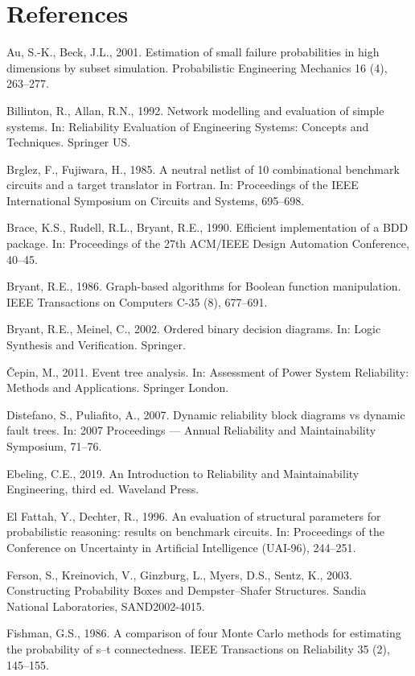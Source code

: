 \documentclass[preprint,12pt]{elsarticle}
\theoremstyle{definition}
\begin{document}
\section*{References}
\begingroup
\setlength{\parindent}{-1.5em}\setlength{\leftskip}{1.5em}\small

Au, S.-K., Beck, J.L., 2001. Estimation of small failure probabilities in high dimensions by subset
simulation. Probabilistic Engineering Mechanics 16 (4), 263--277.

Billinton, R., Allan, R.N., 1992. Network modelling and evaluation of simple systems. In: Reliability
Evaluation of Engineering Systems: Concepts and Techniques. Springer US.

Brglez, F., Fujiwara, H., 1985. A neutral netlist of 10 combinational benchmark circuits and a target
translator in Fortran. In: Proceedings of the IEEE International Symposium on Circuits and Systems,
695--698.

Brace, K.S., Rudell, R.L., Bryant, R.E., 1990. Efficient implementation of a BDD package. In:
Proceedings of the 27th ACM/IEEE Design Automation Conference, 40--45.

Bryant, R.E., 1986. Graph-based algorithms for Boolean function manipulation. IEEE Transactions on
Computers C-35 (8), 677--691.

Bryant, R.E., Meinel, C., 2002. Ordered binary decision diagrams. In: Logic Synthesis and Verification.
Springer.

\v{C}epin, M., 2011. Event tree analysis. In: Assessment of Power System Reliability: Methods and
Applications. Springer London.

Distefano, S., Puliafito, A., 2007. Dynamic reliability block diagrams vs dynamic fault trees. In: 2007
Proceedings --- Annual Reliability and Maintainability Symposium, 71--76.

Ebeling, C.E., 2019. An Introduction to Reliability and Maintainability Engineering, third ed. Waveland
Press.

El Fattah, Y., Dechter, R., 1996. An evaluation of structural parameters for probabilistic reasoning:
results on benchmark circuits. In: Proceedings of the Conference on Uncertainty in Artificial
Intelligence (UAI-96), 244--251.

Ferson, S., Kreinovich, V., Ginzburg, L., Myers, D.S., Sentz, K., 2003. Constructing Probability Boxes
and Dempster--Shafer Structures. Sandia National Laboratories, SAND2002-4015.

Fishman, G.S., 1986. A comparison of four Monte Carlo methods for estimating the probability of s--t
connectedness. IEEE Transactions on Reliability 35 (2), 145--155.
\end{document}
